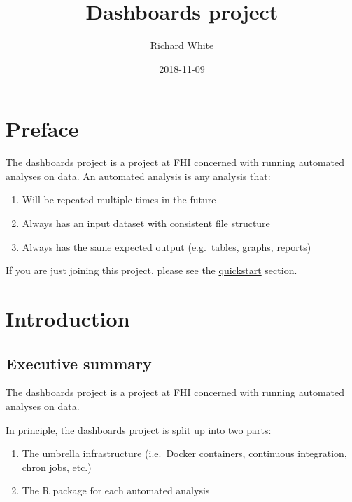 \documentclass[12pt,]{article}
\title{Dashboards project}
\author{Richard White}
\date{2018-11-09}
\providecommand{\tightlist}{%
  \setlength{\itemsep}{0pt}\setlength{\parskip}{0pt}}
\begin{document}
\maketitle

{
\hypersetup{linkcolor=black}
\setcounter{tocdepth}{2}
\tableofcontents
}
\listoftables
\listoffigures
\section*{Preface}\label{preface}

The dashboards project is a project at FHI concerned with running
automated analyses on data. An automated analysis is any analysis that:

\begin{enumerate}
\def\labelenumi{\arabic{enumi}.}
\tightlist
\item
  Will be repeated multiple times in the future
\item
  Always has an input dataset with consistent file structure
\item
  Always has the same expected output (e.g.~tables, graphs, reports)
\end{enumerate}

If you are just joining this project, please see the
\protect\hyperlink{quickstart}{quickstart} section.

\section{Introduction}\label{introduction}

\subsection{Executive summary}\label{executive-summary}

The dashboards project is a project at FHI concerned with running
automated analyses on data.

In principle, the dashboards project is split up into two parts:

\begin{enumerate}
\def\labelenumi{\arabic{enumi}.}
\tightlist
\item
  The umbrella infrastructure (i.e.~Docker containers, continuous
  integration, chron jobs, etc.)
\item
  The R package for each automated analysis
\end{enumerate}
\end{document}
